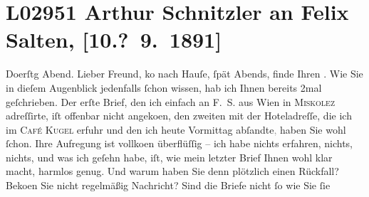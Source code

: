

\section[Arthur Schnitzler an Felix Salten, {[}10.? 9. 1891{]}]{L02951 Arthur Schnitzler an Felix Salten, {[}10.? 9. 1891{]}}
\nopagebreak{}
\rehead{ }\normalsize\beginnumbering{}
\toendnotes[C]{\smallbreak\pagebreak[2]}
\toendnotes[C]{\smallbreak}
\toendnotes[C]{\smallbreak}
\pstart
           \raggedleft{}{\pb}Do{\geminationn}erſtg{ }Abend.\pend
           \vspace{0.5em}
\pstart
           Lieber Freund, ko{\geminationm} nach
               Hauſe,{ }ſpät Abends, finde Ihren \label{K_L02951-1v}\label{K_L02951-1}. Wie Sie in dieſem Augenblick jedenfalls{ }ſchon wissen, hab ich Ihnen bereits
               2mal geſchrieben. Der erſte {\pb}Brief, den ich
               einfach an \textsc{F. S.} aus Wien in \textsc{Miskolez} adreſſirte, iſt offenbar nicht angeko{\geminationm}en, den
               zweiten mit der Hoteladreſſe, die ich im \textsc{Café Kugel} erfuhr und den ich heute{ }Vormittag abſandte\textcolor{gray}{,} haben Sie wohl{ }ſchon. Ihre
               Aufregung ist vollko{\geminationm}en {\pb}überflüſſig – ich habe nichts erfahren,
               nichts, nichts, und was ich geſehn habe, iſt, wie mein letzter Brief Ihnen wohl klar
               macht, harmlos genug. Und warum haben Sie denn plötzlich einen Rückfall? Beko{\geminationm}en­ Sie nicht regelmäßig Nachricht? {\pb}Sind die Briefe nicht{ }ſo wie Sie{ }ſie
